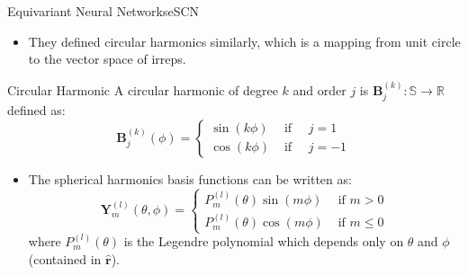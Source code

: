 \documentclass[pdf,serif]{beamer}
\begin{document}
\begin{frame}{Equivariant Neural Networks}{eSCN}
    \begin{itemize}
        \item They defined circular harmonics similarly, which is a mapping from unit circle to the vector space of irreps.
    \end{itemize}
    \begin{defi}{Circular Harmonic}
        A circular harmonic of degree $k$ and order $j$ is $\mathbf{B}_j^{(k)}: \mathbb S \rightarrow \mathbb{R}$ defined as:
        $$
        \mathbf{B}_j^{(k)}(\phi)=\left\{\begin{array}{lll}
        \sin (k \phi) & \text { if } \quad j=1 \\
        \cos (k \phi) & \text { if } \quad j=-1
        \end{array}\right.
        $$
    \end{defi}
         
    \begin{itemize}
        \item The spherical harmonics basis functions can be written as:
        $$
        \mathbf{Y}_m^{(l)}(\theta, \phi)= \begin{cases}P_m^{(l)}(\theta) \sin (m \phi) & \text { if } m>0 \\ P_m^{(l)}(\theta) \cos (m \phi) & \text { if } m \leq 0\end{cases}
        $$
        where $P_m^{(l)}(\theta)$ is the Legendre polynomial which depends only
        on $\theta$ and $\phi$ (contained in $\mathbf{\hat r}$).
    \end{itemize}

\end{frame}
\end{document}
